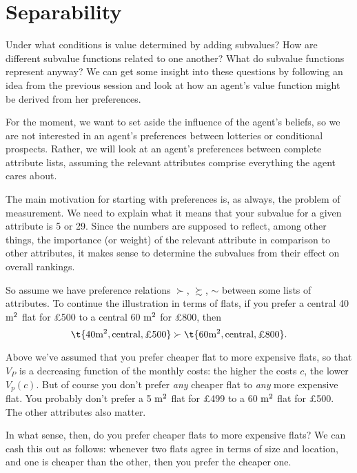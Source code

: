 \section{Separability}

Under what conditions is value determined by adding subvalues? How are
different subvalue functions related to one another? What do subvalue
functions represent anyway? We can get some insight into
these questions by following an idea from the previous session and
look at how an agent's value function might be derived from her
preferences.

For the moment, we want to set aside the influence of the agent's
beliefs, so we are not interested in an agent's preferences between
lotteries or conditional prospects. Rather, we will look at an agent's
preferences between complete attribute lists, assuming the relevant
attributes comprise everything the agent cares about. 

The main motivation for starting with preferences is, as always, the
problem of measurement. We need to explain what it means that your
subvalue for a given attribute is 5 or 29. Since the numbers are
supposed to reflect, among other things, the importance (or weight) of
the relevant attribute in comparison to other attributes, it makes
sense to determine the subvalues from their effect on overall
rankings.
 
So assume we have preference relations $\succ$, $\succsim$, $\sim$
between some lists of attributes. To continue the illustration in
terms of flats, if you prefer a central 40 $\text{m}^2$ flat for £500 to a
central 60 $\text{m}^2$ for £800, then
\[
 \t{40 \m^2, \text{central}, \text{£500}} \succ
 \t{60 \m^2, \text{central}, \text{£800}}.
\]

Above we've assumed that you prefer cheaper flat to more expensive
flats, so that $V_P$ is a decreasing function of the monthly costs:
the higher the costs $c$, the lower $V_p(c)$. But of course you don't
prefer \emph{any} cheaper flat to \emph{any} more expensive flat. You
probably don't prefer a 5 $\text{m}^2$ flat for £499 to a 60 $\text{m}^2$ flat 
for £500. The other attributes also matter.

In what sense, then, do you prefer cheaper flats to more expensive
flats? We can cash this out as follows: whenever two flats agree in
terms of size and location, and one is cheaper than the other, then
you prefer the cheaper one. 

